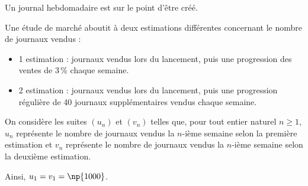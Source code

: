 \medskip

Un journal hebdomadaire est sur le point d'être créé.

Une étude de marché aboutit à deux estimations différentes concernant le nombre de journaux vendus :
\begin{itemize}
\item  1 estimation :  journaux vendus lors du lancement, puis une progression des ventes de 3\,\% chaque semaine.
\item 2 estimation :  journaux vendus lors du lancement, puis une progression régulière de 40 journaux supplémentaires vendus chaque semaine.
 \end{itemize}
On considère les suites $\left(u_n\right)$ et $\left(v_n\right)$ telles que, pour tout entier naturel $n\geqslant 1$, $u_n$ représente le nombre de journaux vendus la $n$-ième semaine selon la première estimation et $v_n$ représente le nombre de journaux vendus la $n$-ième semaine selon la deuxième estimation. 

Ainsi, $u_1 = v_1 = \np{1000}$.

\medskip


